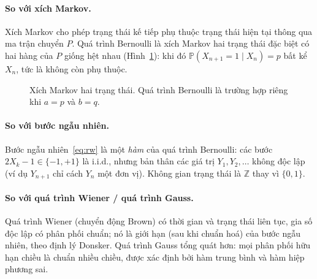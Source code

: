 \documentclass[12pt,a4paper]{article}
\theoremstyle{definition}
\theoremstyle{remark}
\newcommand{\Prob}{\mathbb{P}}
\begin{document}
\paragraph{So với xích Markov.} Xích Markov cho phép trạng thái kế tiếp phụ thuộc trạng thái hiện tại thông qua
ma trận chuyển $P$. Quá trình Bernoulli là xích Markov hai trạng thái đặc biệt có hai hàng của $P$ giống hệt nhau
(Hình~\ref{fig:markov}): khi đó $\Prob(X_{n+1}=1\mid X_n)=p$ bất kể $X_n$, tức là không còn phụ thuộc.

\begin{figure}[ht]
\centering
{}
\caption{Xích Markov hai trạng thái. Quá trình Bernoulli là trường hợp riêng khi $a = p$ và $b = q$.}
\label{fig:markov}
\end{figure}

\paragraph{So với bước ngẫu nhiên.} Bước ngẫu nhiên~\eqref{eq:rw} là một \emph{hàm} của quá trình Bernoulli:
các bước $2X_k-1\in\{-1,+1\}$ là i.i.d., nhưng bản thân các giá trị $Y_1, Y_2, \dots$ không độc lập (ví dụ
$Y_{n+1}$ chỉ cách $Y_n$ một đơn vị). Không gian trạng thái là $\mathbb Z$ thay vì $\{0,1\}$.

\paragraph{So với quá trình Wiener / quá trình Gauss.} Quá trình Wiener (chuyển động Brown) có thời gian và
trạng thái liên tục, gia số độc lập có phân phối chuẩn; nó là giới hạn (sau khi chuẩn hoá) của bước ngẫu nhiên,
theo định lý Donsker. Quá trình Gauss tổng quát hơn: mọi phân phối hữu hạn chiều là chuẩn nhiều chiều, được xác
định bởi hàm trung bình và hàm hiệp phương sai.
\end{document}
